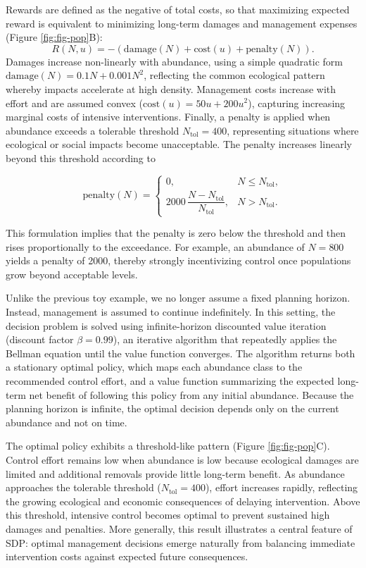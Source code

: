 \documentclass[
  11pt,
  a4paper,
]{article}
\begin{document}
Rewards are defined as the negative of total costs, so that maximizing expected reward is equivalent to minimizing long-term damages and management expenses (Figure \ref{fig:fig-pop}B):
\[
R(N,u)=-(\text{damage}(N)+\text{cost}(u)+\text{penalty}(N)).
\]
Damages increase non-linearly with abundance, using a simple quadratic form \(\text{damage}(N)=0.1 N + 0.001 N^2\), reflecting the common ecological pattern whereby impacts accelerate at high density. Management costs increase with effort and are assumed convex (\(\text{cost}(u) = 50 u + 200 u^2\)), capturing increasing marginal costs of intensive interventions. Finally, a penalty is applied when abundance exceeds a tolerable threshold \(N_{\text{tol}} = 400\), representing situations where ecological or social impacts become unacceptable. The penalty increases linearly beyond this threshold according to

\[
\text{penalty}(N) =
\begin{cases}
0, & N \le N_{\text{tol}}, \\
2000\,\dfrac{N - N_{\text{tol}}}{N_{\text{tol}}}, & N > N_{\text{tol}} .
\end{cases}
\]

This formulation implies that the penalty is zero below the threshold and then rises proportionally to the exceedance. For example, an abundance of \(N = 800\) yields a penalty of 2000, thereby strongly incentivizing control once populations grow beyond acceptable levels.

Unlike the previous toy example, we no longer assume a fixed planning horizon. Instead, management is assumed to continue indefinitely. In this setting, the decision problem is solved using infinite-horizon discounted value iteration (discount factor \(\beta=0.99\)), an iterative algorithm that repeatedly applies the Bellman equation until the value function converges. The algorithm returns both a stationary optimal policy, which maps each abundance class to the recommended control effort, and a value function summarizing the expected long-term net benefit of following this policy from any initial abundance. Because the planning horizon is infinite, the optimal decision depends only on the current abundance and not on time.

The optimal policy exhibits a threshold-like pattern (Figure \ref{fig:fig-pop}C). Control effort remains low when abundance is low because ecological damages are limited and additional removals provide little long-term benefit. As abundance approaches the tolerable threshold (\(N_{\mathrm{tol}} = 400\)), effort increases rapidly, reflecting the growing ecological and economic consequences of delaying intervention. Above this threshold, intensive control becomes optimal to prevent sustained high damages and penalties. More generally, this result illustrates a central feature of SDP: optimal management decisions emerge naturally from balancing immediate intervention costs against expected future consequences.
\end{document}
